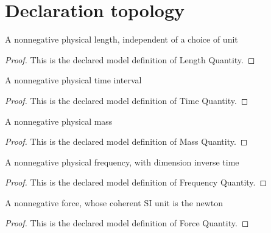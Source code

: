 \section{Declaration topology}
\begin{definition}
  \label{def:physics:phyx-mini-0514:phyxminiproblems-problemphyxmini0514-lengthquantity}
  A nonnegative physical length, independent of a choice of unit
\end{definition}
\begin{proof}
  This is the declared model definition of Length Quantity.
\end{proof}
\begin{definition}
  \label{def:physics:phyx-mini-0514:phyxminiproblems-problemphyxmini0514-timequantity}
  A nonnegative physical time interval
\end{definition}
\begin{proof}
  This is the declared model definition of Time Quantity.
\end{proof}
\begin{definition}
  \label{def:physics:phyx-mini-0514:phyxminiproblems-problemphyxmini0514-massquantity}
  A nonnegative physical mass
\end{definition}
\begin{proof}
  This is the declared model definition of Mass Quantity.
\end{proof}
\begin{definition}
  \label{def:physics:phyx-mini-0514:phyxminiproblems-problemphyxmini0514-frequencyquantity}
  A nonnegative physical frequency, with dimension inverse time
\end{definition}
\begin{proof}
  This is the declared model definition of Frequency Quantity.
\end{proof}
\begin{definition}
  \label{def:physics:phyx-mini-0514:phyxminiproblems-problemphyxmini0514-forcequantity}
  A nonnegative force, whose coherent SI unit is the newton
\end{definition}
\begin{proof}
  This is the declared model definition of Force Quantity.
\end{proof}
